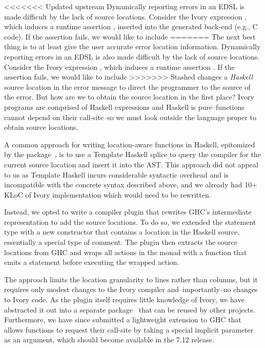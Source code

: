 
<<<<<<< Updated upstream
Dynamically reporting errors in an EDSL is made difficult by the lack of
source locations. Consider the Ivory expression \hbox{,} which induces a
runtime assertion , inserted into the generated back-end (e.g., C code). If the assertion fails, we would like to include
=======
The next best thing is to at least give the user accurate error location
information. Dynamically reporting errors in an EDSL is also made difficult by the lack of
source locations. Consider the Ivory expression \hbox{,} which induces a
runtime assertion . If the assertion fails, we would like to include
>>>>>>> Stashed changes
a \emph{Haskell} source location in the error message to direct the programmer to the source of
the error. But how are we to obtain the source location in the first place?
Ivory programs are comprised of Haskell expressions and Haskell is
pure--functions cannot depend on their call-site--so we must look outside the
language proper to obtain source locations.

A common approach for writing location-aware functions in Haskell, epitomized by
the  package~\cite{file-location}, is to use a Template
Haskell splice to query the compiler for the current source location and insert
it into the AST. This approach did not appeal to us as Template Haskell incurs
considerable syntactic overhead and is incompatible with the concrete syntax
described above, and we already had 10+ KLoC of Ivory implementation which would need to be
rewritten.

Instead, we opted to write a compiler plugin that rewrites GHC's intermediate
representation to add the source locations. To do so, we extended the  statement type with a new
 constructor that contains a location in the Haskell source,
essentially a special type of comment. The plugin then extracts the source
locations from GHC and wraps all actions in the  monad with a
 function that emits a  statement before executing
the wrapped action.

The approach limits the location granularity to
lines rather than columns, but it requires only modest changes to the
Ivory compiler and--importantly--no changes to Ivory code. As the plugin
itself requires little knowledge of Ivory, we have abstracted it out into a
separate package~\cite{ghc-srcspan-plugin} that can be reused by other projects.
Furthermore, we have since submitted a lightweight extension to GHC that allows
functions to request their call-site by taking a special implicit
parameter~\cite{lewis2000implicit} as an argument, which should become available
in the 7.12 release.
